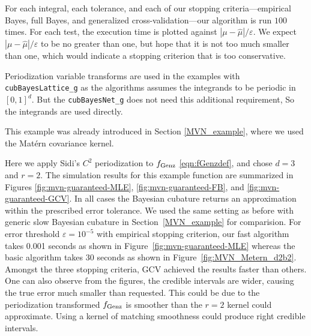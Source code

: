 \documentclass{iitthesis}          %
\newcommand{\hmu}{\widehat{\mu}}
\newcommand{\code}[1]{\texttt{#1}}
\def\abs#1{\ensuremath{\left \lvert #1 \right \rvert}}
\newcommand\figref{Figure~\ref}
\newcommand\secref{Section~\ref}
\begin{document}
For each integral,  each tolerance, and each of our stopping criteria---empirical Bayes, full Bayes, and generalized cross-validation---our algorithm is run  $100$ times.  For each test, the execution time is plotted against $\abs{\mu - \hmu}/\varepsilon$.  We expect $\abs{\mu - \hmu}/\varepsilon$ to be no greater than one, but hope that it is not too much smaller than one, which would indicate a stopping criterion that is too conservative.

Periodization variable transforms are used in the examples with \allowbreak \code{cubBayesLattice\_g} as the algorithms assumes the integrands to be periodic in $[0,1]^d$. But the \allowbreak \code{cubBayesNet\_g} does not need this additional requirement, So the integrands are used directly.




This example was already introduced in Section \ref{MVN_example}, where we used the Mat\'ern covariance kernel.  

\Subsection{Using \code{cubBayesLattice\_g}}
Here we apply Sidi's $C^2$  periodization to $ f_{\textup{Genz}}$ \eqref{eqn:fGenzdef}, and chose $d=3$ and $r=2$. The simulation results for this example function are summarized in Figures \ref{fig:mvn-guaranteed-MLE}, \ref{fig:mvn-guaranteed-FB}, and \ref{fig:mvn-guaranteed-GCV}.  In all cases the Bayesian cubature returns an approximation within the prescribed error tolerance. We used the same setting as before with generic slow Bayesian cubature in \secref{MVN_example} for comparision. For error threshold $\varepsilon=10^{-5}$ with empirical stopping criterion, our fast algorithm takes 0.001 seconds as shown in \figref{fig:mvn-guaranteed-MLE} whereas the basic algorithm takes 30 seconds as shown in \figref{fig:MVN_Metern_d2b2}. 
Amongst the three stopping criteria, GCV achieved the results faster than others. 
One can also observe from the figures, the credible intervals are wider, causing the true error much smaller than requested.
This could be due to the periodization transformed $f_\textup{Genz}$ is smoother than the $r=2$ kernel could approximate. Using a kernel of matching smoothness could produce right credible intervals.
\end{document}
